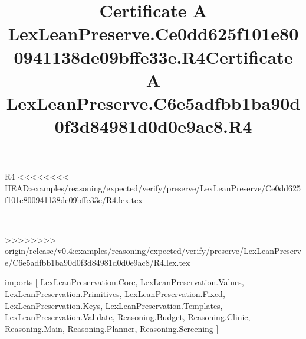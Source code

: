 \begin{lexlean}{R4}
<<<<<<<< HEAD:examples/reasoning/expected/verify/preserve/LexLeanPreserve/Ce0dd625f101e800941138de09bffe33e/R4.lex.tex
\title{Certificate A LexLeanPreserve.Ce0dd625f101e800941138de09bffe33e.R4}
========
\title{Certificate A LexLeanPreserve.C6e5adfbb1ba90d0f3d84981d0d0e9ac8.R4}
>>>>>>>> origin/release/v0.4:examples/reasoning/expected/verify/preserve/LexLeanPreserve/C6e5adfbb1ba90d0f3d84981d0d0e9ac8/R4.lex.tex
\begin{coremodule}
imports [
  LexLeanPreservation.Core,
  LexLeanPreservation.Values,
  LexLeanPreservation.Primitives,
  LexLeanPreservation.Fixed,
  LexLeanPreservation.Keys,
  LexLeanPreservation.Templates,
  LexLeanPreservation.Validate,
  Reasoning.Budget,
  Reasoning.Clinic,
  Reasoning.Main,
  Reasoning.Planner,
  Reasoning.Screening
]


\end{coremodule}
\end{lexlean}
